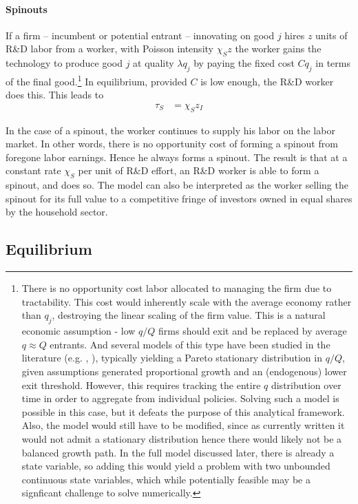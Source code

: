 \documentclass[12pt,english]{article}
\theoremstyle{remark}
\begin{document}
\paragraph{Spinouts} If a firm -- incumbent or potential entrant -- innovating on good $j$ hires $z$ units of R\&D labor from a worker, with Poisson intensity $\chi_S z$ the worker gains the technology to produce good $j$ at quality $\lambda q_j$ by paying the fixed cost $C q_j$ in terms of the final good.\footnote{There is no opportunity cost labor allocated to managing the firm due to tractability. This cost would inherently scale with the average economy rather than $q_j$, destroying the linear scaling of the firm value. This is a natural economic assumption - low $q/Q$ firms should exit and be replaced by average $q \approx Q$ entrants. And several models of this type have been studied in the literature (e.g. \cite{acemoglu_innovation_2015}, ), typically yielding a Pareto stationary distribution in $q/Q$, given assumptions generated proportional growth and an (endogenous) lower exit threshold. However, this requires tracking the entire $q$ distribution over time in order to aggregate from individual policies. Solving such a model is possible in this case, but it defeats the purpose of this analytical framework. Also, the model would still have to be modified, since as currently written it would not admit a stationary distribution hence there would likely not be a balanced growth path. In the full model discussed later, there is already a state variable, so adding this would yield a problem with two unbounded continuous state variables, which while potentially feasible may be a signficant challenge to solve numerically.} In equilibrium, provided $C$ is low enough, the R\&D worker does this. This leads to
\begin{align}
	\tau_S &= \chi_S z_I \label{simplified_spinout_innovation_rate}
\end{align}

In the case of a spinout, the worker continues to supply his labor on the labor market. In other words, there is no opportunity cost of forming a spinout from foregone labor earnings. Hence he always forms a spinout. The result is that at a constant rate $\chi_S$ per unit of R\&D effort, an R\&D worker is able to form a spinout, and does so. The model can also be interpreted as the worker selling the spinout for its full value to a competitive fringe of investors owned in equal shares by the household sector. 

\subsection{Equilibrium}
\end{document}
